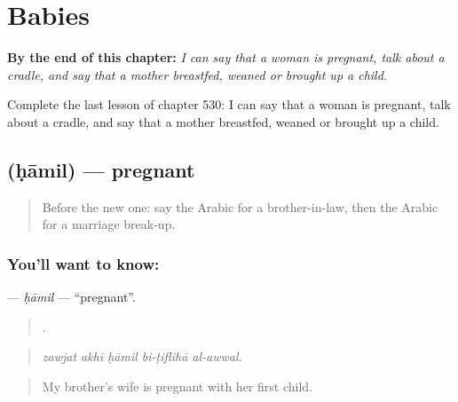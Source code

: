 
\chapter{Babies}
\label{ch:ar-babies}

\begin{chapteropening}
\textbf{By the end of this chapter:} \emph{I can say that a woman is pregnant, talk about a cradle, and say that a mother breastfed, weaned or brought up a child.}

Complete the last lesson of chapter 530: I can say that a woman is pregnant, talk about a cradle, and say that a mother breastfed, weaned or brought up a child.
\end{chapteropening}

\section[\texorpdfstring{\ar{حامل} (ḥāmil)}{حامل (ḥāmil)}]{ (ḥāmil) — pregnant}

\label{lesson:AR-C530-hamil}



\begin{quote}
Before the new one: say the Arabic for a brother-in-law, then the Arabic for a marriage break-up.
\end{quote}

\subsection*{You'll want to know: }
\textbf{} — \emph{ḥāmil} — \textquotedblleft{}pregnant\textquotedblright{}.

\begin{quote}
    .
\end{quote}

\begin{quote}
\emph{zawjat akhī ḥāmil bi-ṭiflihā al-awwal.}
\end{quote}

\begin{quote}
My brother's wife is pregnant with her first child.
\end{quote}

